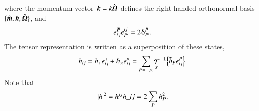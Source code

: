 where the momentum vector $\boldsymbol{k}= k\hat{\boldsymbol{\varOmega}}$ defines the right-handed orthonormal basis $\{\hat{\boldsymbol{m}}, \hat{\boldsymbol{n}}, \hat{\boldsymbol{\varOmega}} \}$, and
\begin{equation}
    e\indices*{^{P}_{ij}} e\indices*{^{ij}_{P'}} = 2\deltaup^{P}_{P'}.
\end{equation}
The tensor representation is written as a superposition of these states,
\begin{equation}
    h_{ij} = h_\polplus e\indices*{^{\polplus}_{ij}} + h_\polcross e\indices*{^{\polcross}_{ij}} = \sum_{P=\polplus, \polcross} 
    {\mathop{\mathcal{F}}_{\vec{x}}}^{-1}{\cclosed{\Ft{h}_P e\indices*{^{P}_{ij}}}}.
\end{equation}
Note that
\begin{equation}
    \abs{h}^2 =  h\^{ij}h\_{ij} = 2 \sum_{P}h_P^2.
\end{equation}



